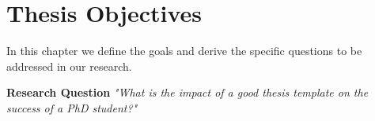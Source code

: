 \chapter{Thesis Objectives}
\label{cap:thesis_objectives}

In this chapter we define the goals and derive the specific questions to be addressed in our research.

\begin{myframe}
\textbf{Research Question}
\emph{"What is the impact of a good thesis template on the success of a PhD student?"}
\end{myframe}